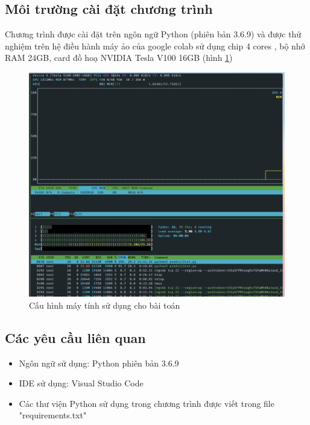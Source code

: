 \documentclass[a4paper, 12pt]{report}
\begin{document}
\subsection{Môi trường cài đặt chương trình}
Chương trình được cài đặt trên ngôn ngữ Python (phiên bản 3.6.9) và được thử nghiệm trên hệ điều hành máy ảo của google colab sử dụng chip 4 cores , bộ nhớ RAM 24GB,  card đồ hoạ NVIDIA Tesla V100 16GB (hình \ref{fig:nvidia-smi})
 \begin{figure}[!h]
	\centering
	\includegraphics[width=0.8\linewidth]{Images/nvidia-smi}
	\caption{Cấu hình máy tính sử dụng cho bài toán}
	\label{fig:nvidia-smi}
\end{figure}
\subsection{Các yêu cầu liên quan}
\begin{itemize}
	\item Ngôn ngữ sử dụng: Python phiên bản 3.6.9
	\item IDE sử dụng: Visual Studio Code
	\item Các thư viện Python sử dụng trong chương trình được viết trong file "requirements.txt"
\end{itemize}
\end{document}
